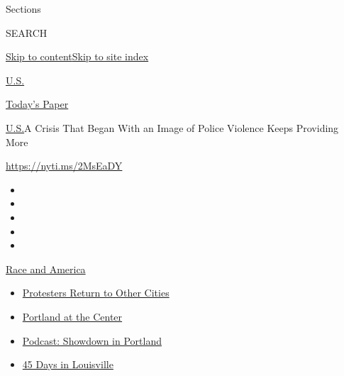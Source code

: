 Sections

SEARCH

\protect\hyperlink{site-content}{Skip to
content}\protect\hyperlink{site-index}{Skip to site index}

\href{https://www.nytimes.com/section/us}{U.S.}

\href{https://myaccount.nytimes.com/auth/login?response_type=cookie\&client_id=vi}{}

\href{https://www.nytimes.com/section/todayspaper}{Today's Paper}

\href{/section/us}{U.S.}\textbar{}A Crisis That Began With an Image of
Police Violence Keeps Providing More

\url{https://nyti.ms/2MsEaDY}

\begin{itemize}
\item
\item
\item
\item
\item
\end{itemize}

\href{https://www.nytimes.com/news-event/george-floyd-protests-minneapolis-new-york-los-angeles?action=click\&pgtype=Article\&state=default\&region=TOP_BANNER\&context=storylines_menu}{Race
and America}

\begin{itemize}
\tightlist
\item
  \href{https://www.nytimes.com/2020/07/26/us/protests-portland-seattle-trump.html?action=click\&pgtype=Article\&state=default\&region=TOP_BANNER\&context=storylines_menu}{Protesters
  Return to Other Cities}
\item
  \href{https://www.nytimes.com/2020/07/24/us/portland-oregon-protests-white-race.html?action=click\&pgtype=Article\&state=default\&region=TOP_BANNER\&context=storylines_menu}{Portland
  at the Center}
\item
  \href{https://www.nytimes.com/2020/07/23/podcasts/the-daily/portland-protests.html?action=click\&pgtype=Article\&state=default\&region=TOP_BANNER\&context=storylines_menu}{Podcast:
  Showdown in Portland}
\item
  \href{https://www.nytimes.com/interactive/2020/07/16/us/black-lives-matter-protests-louisville-breonna-taylor.html?action=click\&pgtype=Article\&state=default\&region=TOP_BANNER\&context=storylines_menu}{45
  Days in Louisville}
\end{itemize}

